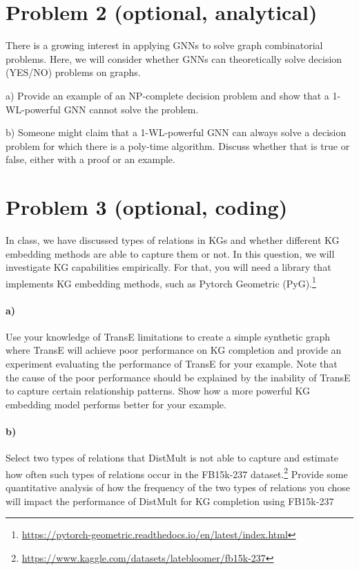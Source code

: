 \documentclass{article}
\begin{document}
\section*{Problem 2 (optional, analytical)}

There is a growing interest in applying GNNs to solve graph combinatorial problems. Here, we will consider whether GNNs can theoretically solve decision (YES/NO) problems on graphs.

a) Provide an example of an NP-complete decision problem and show that a 1-WL-powerful GNN cannot solve the problem.

b) Someone might claim that a 1-WL-powerful GNN can always solve a decision problem for which there is a poly-time algorithm. Discuss whether that is true or false, either with a proof or an example.

\section*{Problem 3 (optional, coding)}

In class, we have discussed types of relations in KGs and whether different KG embedding methods are able to capture them or not. In this question, we will investigate KG capabilities empirically. For that, you will need a library that implements KG embedding methods, such as Pytorch Geometric (PyG).\footnote{\url{https://pytorch-geometric.readthedocs.io/en/latest/index.html}}

\paragraph{a)} Use your knowledge of TransE limitations to create a simple synthetic graph where TransE will achieve poor performance on KG completion and provide an experiment evaluating the performance of TransE for your example. Note that the cause of the poor performance should be explained by the inability of TransE to capture certain relationship patterns. Show how a more powerful KG embedding model performs better for your example.

\paragraph{b)} Select two types of relations that DistMult is not able to capture and estimate how often such types of relations occur in the FB15k-237 dataset.\footnote{\url{https://www.kaggle.com/datasets/latebloomer/fb15k-237}} Provide some quantitative analysis of how the frequency of the two types of relations you chose will impact the performance of DistMult for KG completion using FB15k-237
\end{document}
